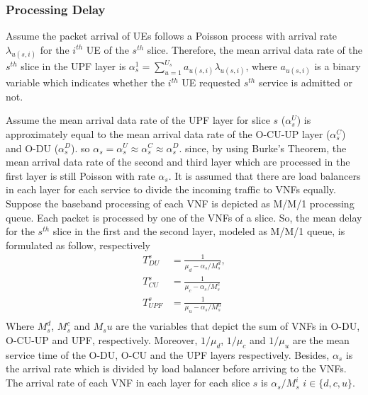 \documentclass[conference]{IEEEtran}
\begin{document}
\subsubsection{Processing Delay}
Assume the packet arrival of UEs follows a Poisson process with arrival rate $\lambda_{u(s,i)}$ for the $i^{th}$ UE of the $s^{th}$ slice.
Therefore, the mean arrival data rate of the $s^{th}$ slice in the UPF layer is $\alpha_{s}^1 = \sum_{u=1}^{U_s}a_{u(s,i)}\lambda_{u(s,i)}$, where $a_{u(s,i)}$ is a binary variable which indicates whether the $i^{th}$ UE requested $s^{th}$ service is admitted or not.

Assume the mean arrival data rate of the UPF layer for slice $s$ ($\alpha_{s}^U$) is approximately equal to the mean arrival data rate of the O-CU-UP layer ($\alpha_{s}^C$) and O-DU ($\alpha_{s}^D$). so $\alpha_{s} =\alpha_{s}^U \approx \alpha_{s}^C \approx \alpha_{s}^D$. since, by using Burke’s Theorem, the mean arrival data rate of the second and third layer which are processed in the first layer is still Poisson with rate $\alpha_{s}$.
It is assumed that there are load balancers in each layer for each service to divide the incoming traffic to VNFs equally. %
Suppose the baseband processing of each VNF is depicted as M/M/1 processing queue.
Each packet is processed by one of the VNFs of a slice. So, the mean delay for the $s^{th}$ slice in the first and the second layer, modeled as M/M/1 queue, is formulated as follow, respectively
\begin{equation}
\begin{split}
T_{DU}^{s} &= \frac{1}{\mu_d - \alpha_{s}/{M_s^{d}}},\\
T_{CU}^{s} &= \frac{1}{\mu_c - \alpha_{s}/{M_s^{c}}}\\
T_{UPF}^{s} &= \frac{1}{\mu_u - \alpha_{s}/{M_s^{u}}}\\
\end{split}
\end{equation}
Where $M_s^{d}$, $M_s^{c}$ and 
$M_s{u}$ are the variables that depict the sum of VNFs in O-DU, O-CU-UP and UPF, respectively. 
Moreover, $1/\mu_d$, $1/\mu_c$ and $1/\mu_u$ are the mean service time of the O-DU, O-CU and the UPF layers respectively.
Besides, $\alpha_{s}$ is the  arrival rate which is divided
by load balancer before arriving to the VNFs. The arrival rate of each VNF in each layer for each slice 
$s$ is $\alpha_{s}/{M_s^{i}}$ $ i \in \{d,c, u\}$.
\end{document}
